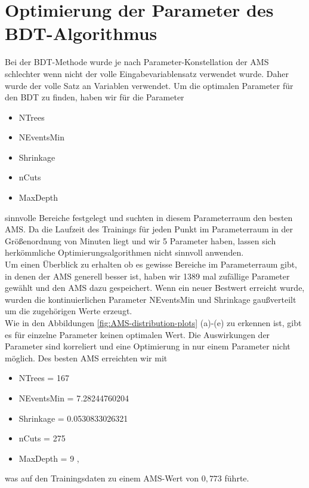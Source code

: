\section{Optimierung der Parameter des BDT-Algorithmus}
\label{sec:bdt_optimization}
Bei der BDT-Methode wurde je nach Parameter-Konstellation der AMS schlechter wenn nicht der volle Eingabevariablensatz verwendet wurde. Daher wurde der volle Satz an Variablen verwendet. Um die optimalen Parameter für den BDT zu finden, haben wir für die Parameter
\begin{itemize}
	\item NTrees
	\item NEventsMin
	\item Shrinkage
	\item nCuts
	\item MaxDepth
\end{itemize} 
sinnvolle Bereiche festgelegt und suchten in diesem Parameterraum den besten AMS. Da die Laufzeit des Trainings für jeden Punkt im Parameterraum in der Größenordnung von Minuten liegt und wir 5 Parameter haben, lassen sich herkömmliche Optimierungsalgorithmen nicht sinnvoll anwenden.\\
Um einen Überblick zu erhalten ob es gewisse Bereiche im Parameterraum gibt, in denen der AMS generell besser ist, haben wir 1389 mal zufällige Parameter gewählt und den AMS dazu gespeichert. Wenn ein neuer Bestwert erreicht wurde, wurden die kontinuierlichen Parameter NEventsMin und Shrinkage gaußverteilt um die zugehörigen Werte erzeugt.\\
Wie in den Abbildungen \ref{fig:AMS-distribution-plots} (a)-(e) zu erkennen ist, gibt es für einzelne Parameter keinen optimalen Wert. Die Auswirkungen der Parameter sind korreliert und eine Optimierung in nur einem Parameter nicht möglich. Des besten AMS erreichten wir mit
\begin{itemize}
	\item NTrees = 167
	\item NEventsMin = 7.28244760204
	\item Shrinkage = 0.0530833026321
	\item nCuts = 275
	\item MaxDepth  = 9  ,
\end{itemize} 
was auf den Trainingsdaten zu einem AMS-Wert von $0{,}773$ führte.

